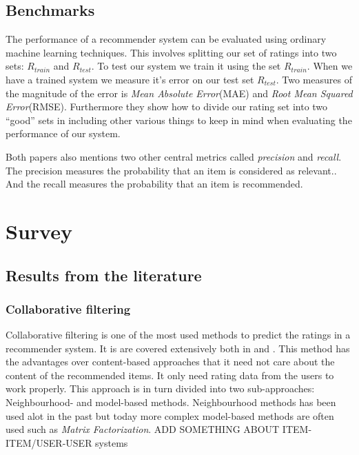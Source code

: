 \documentclass[a4paper,11pt]{article}
\begin{document}
\subsection{Benchmarks}
The performance of a recommender system can be evaluated using ordinary machine learning techniques.
This involves splitting our set of ratings into two sets: $R_{train}$ and $R_{test}$. To test our system
we train it using the set $R_{train}$. When we have a trained system we measure it's error on our test set
$R_{test}$. Two measures of the magnitude of the error is \emph{Mean Absolute Error}(MAE) and
\emph{Root Mean Squared Error}(RMSE).\cite{springerlink:10.1007/978-0-387-85820-3_1}
Furthermore they show how to divide our rating set into two ``good'' sets in \cite{Herlocker:2004:ECF:963770.963772}
including other various things to keep in mind when evaluating the performance of our system.

Both papers also mentions two other central metrics called \emph{precision} and \emph{recall}. The precision
measures the probability that an item is considered as relevant.\cite{Herlocker:2004:ECF:963770.963772}. And
the recall measures the probability that an item is recommended.\cite{Herlocker:2004:ECF:963770.963772}

\section{Survey}
\subsection{Results from the literature}
\subsubsection{Collaborative filtering}
Collaborative filtering is one of the most used methods to predict the ratings in
a recommender system. It is are covered extensively both in \cite{springerlink:10.1007/978-0-387-85820-3_1} and \cite{1423975}. This method has the advantages over content-based approaches that it need not care about the content of the recommended items\cite{1423975}. It only need rating data from the users to work properly. This approach is in turn divided into two sub-approaches: Neighbourhood- and model-based methods. Neighbourhood methods has been used alot in the past but today more complex model-based methods are often used such as \emph{Matrix Factorization}.
ADD SOMETHING ABOUT ITEM-ITEM/USER-USER systems
\end{document}

